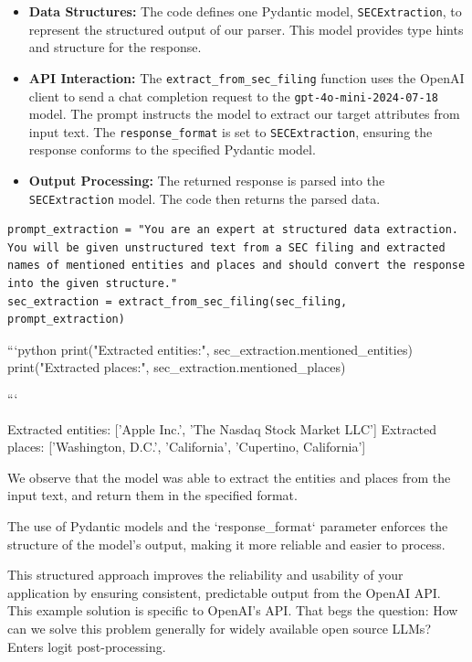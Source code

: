 \begin{itemize}
    \item \textbf{Data Structures:} The code defines one Pydantic model, \texttt{SECExtraction}, to represent the structured output of our parser. This model provides type hints and structure for the response.
    \item \textbf{API Interaction:} The \texttt{extract\_from\_sec\_filing} function uses the OpenAI client to send a chat completion request to the \texttt{gpt-4o-mini-2024-07-18} model. The prompt instructs the model to extract our target attributes from input text. The \texttt{response\_format} is set to \texttt{SECExtraction}, ensuring the response conforms to the specified Pydantic model.
    \item \textbf{Output Processing:} The returned response is parsed into the \texttt{SECExtraction} model. The code then returns the parsed data.
\end{itemize}

\begin{verbatim}
prompt_extraction = "You are an expert at structured data extraction. You will be given unstructured text from a SEC filing and extracted names of mentioned entities and places and should convert the response into the given structure."
sec_extraction = extract_from_sec_filing(sec_filing, prompt_extraction)
\end{verbatim}


```python
print("Extracted entities:", sec_extraction.mentioned_entities)
print("Extracted places:", sec_extraction.mentioned_places)

```

    Extracted entities: ['Apple Inc.', 'The Nasdaq Stock Market LLC']
    Extracted places: ['Washington, D.C.', 'California', 'Cupertino, California']


We observe that the model was able to extract the entities and places from the input text, and return them in the specified format.

The use of Pydantic models and the `response_format` parameter enforces the structure of the model's output, making it more reliable and easier to process.

This structured approach improves the reliability and usability of your application by ensuring consistent, predictable output from the OpenAI API.
This example solution is specific to OpenAI's API. That begs the question: How can we solve this problem generally for widely available open source LLMs? Enters logit post-processing.

